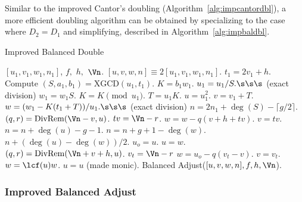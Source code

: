 Similar to the improved Cantor's doubling (Algorithm~\ref{alg:impcantordbl}), a
more efficient doubling algorithm can be obtained by specializing to the case
where $D_2 = D_1$ and simplifying, described in Algorithm~\ref{alg:impbaldbl}.

\begin{algorithm}[htbp]
    \caption{Improved Balanced Double}
    \label{alg:impbaldbl}
    \begin{algorithmic}[1]
        \Require $[u_1,v_1,w_1,n_1]$, $f,$ $h,$ $\Vn$.
        \Ensure $[u,v,w,n] \equiv 2[u_1,v_1,w_1,n_1]$.
        \vspace{3pt}
        \State $t_1 = 2v_1 + h$.
        \State Compute $(S,a_1,b_1) = \mathrm{XGCD}(u_1,t_1)$.
        \State $K = b_1w_1$.
            \State $u_1 = u_1/S. \s\s\s$ (exact division)
            \State $w_1 = w_1S$.
        \EndIf
        \State $K = K \pmod{u_1}$.
        \State $T = u_1K$.
        \State $u = u_1^2$.
        \State $v = v_1 + T$.
        \State $w = (w_1 - K(t_1 + T))/u_1. \s\s\s$ (exact division)
        \State $n = 2n_1 + \deg (S) - \lceil g/2 \rceil$.
                \State $(q,r) = \mathrm{DivRem}(\Vn - v,u)$.
                \State $tv = \Vn -r$.
                \State $w = w - q(v + h + tv)$.
                \State $v = tv$.
            \EndIf
        \Else
                    \State $n = n + \deg(u) - g - 1$.
                    \State $n = n + g + 1 - \deg(w)$.
                \Else \hspace{2pt} $n + (\deg(u) - \deg(w))/2$.
                \EndIf
                \State $u_o = u$.
                \State $u = w$.
                \State $(q,r) = \mathrm{DivRem}(\Vn + v + h,u)$.
                \State $v_t = \Vn - r$
                \State $w = u_o - q(v_t - v)$.
                \State $v = v_t$.
            \EndWhile
            \State $w = \lcf(u)w$.
            \State $u = u$ (made monic).
        \EndIf
        \State \Return Balanced Adjust($[u,v,w,n],f,h,\Vn$).
    \end{algorithmic}
\end{algorithm}

\subsubsection{Improved Balanced Adjust} \label{sec:balimprovedadj}

